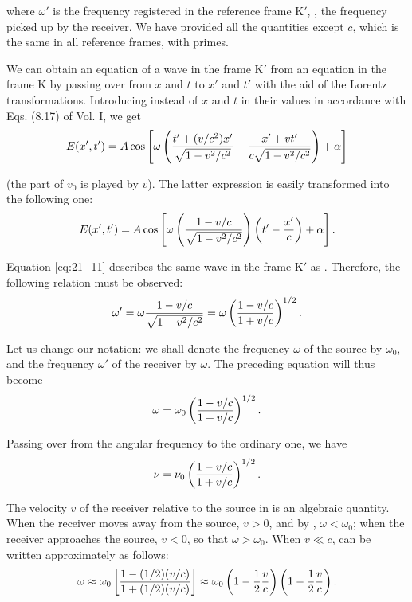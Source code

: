 \noindent
where $\omega'$ is the frequency registered in the reference frame K$'$, \ie, the frequency picked up by the receiver.
We have provided all the quantities except $c$, which is the same in all reference frames, with primes.

We can obtain an equation of a wave in the frame K$'$ from an equation in the frame K by passing over from $x$ and $t$ to $x'$ and $t'$ with the aid of the Lorentz transformations.
Introducing instead of $x$ and $t$ in  their values in accordance with Eqs. (8.17) of Vol. I, we get
\begin{equation*}
	E(x',t') = A\cos\left[\omega \left( \frac{t'+(v/c^2)x'}{\sqrt{1-v^2/c^2}} - \frac{x'+vt'}{c \sqrt{1-v^2/c^2}} \right) +\alpha \right]
\end{equation*}

\noindent
(the part of $v_0$ is played by $v$).
The latter expression is easily transformed into the following one:
\begin{equation}\label{eq:21_11}
	E(x',t') = A\cos\left[\omega \left( \frac{1-v/c}{\sqrt{1-v^2/c^2}} \right) \left(t' - \frac{x'}{c}\right) +\alpha \right].
\end{equation}

Equation \eqref{eq:21_11} describes the same wave in the frame K$'$ as .
Therefore, the following relation must be observed:
\begin{equation*}
	\omega' = \omega \frac{1-v/c}{\sqrt{1-v^2/c^2}} = \omega \left(\frac{1-v/c}{1+v/c}\right)^{1/2}.
\end{equation*}

\noindent
Let us change our notation: we shall denote the frequency $\omega$ of the source by $\omega_0$, and the frequency $\omega'$ of the receiver by $\omega$.
The preceding equation will thus become
\begin{equation}\label{eq:21_12}
	\omega = \omega_0 \left(\frac{1-v/c}{1+v/c}\right)^{1/2}.
\end{equation}

\noindent
Passing over from the angular frequency to the ordinary one, we have
\begin{equation}\label{eq:21_13}
	\nu = \nu_0 \left(\frac{1-v/c}{1+v/c}\right)^{1/2}.
\end{equation}

The velocity $v$ of the receiver relative to the source in  is an algebraic quantity.
When the receiver moves away from the source, $v > 0$, and by , $\omega<\omega_0$; when the receiver approaches the source, $v<0$, so that $\omega>\omega_0$.
When $v\ll c$,  can be written approximately as follows:
\begin{equation*}
	\omega \approx \omega_0 \left[ \frac{1 -(1/2)(v/c)}{1 + (1/2)(v/c)} \right] \approx \omega_0 \left(1 - \frac{1}{2} \frac{v}{c}\right) \left(1 - \frac{1}{2} \frac{v}{c}\right).
\end{equation*}

